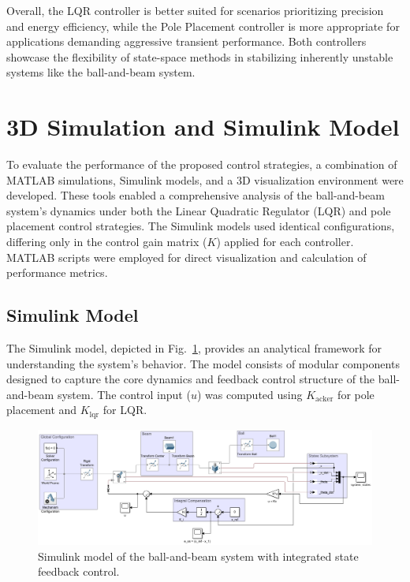 \documentclass[conference]{IEEEtran}
\begin{document}
Overall, the LQR controller is better suited for scenarios prioritizing precision and energy efficiency, while the Pole Placement controller is more appropriate for applications demanding aggressive transient performance. Both controllers showcase the flexibility of state-space methods in stabilizing inherently unstable systems like the ball-and-beam system.

\section{3D Simulation and Simulink Model}
\label{sec:simulation_model}

To evaluate the performance of the proposed control strategies, a combination of MATLAB simulations, Simulink models, and a 3D visualization environment were developed. These tools enabled a comprehensive analysis of the ball-and-beam system's dynamics under both the Linear Quadratic Regulator (LQR) and pole placement control strategies. The Simulink models used identical configurations, differing only in the control gain matrix (\(K\)) applied for each controller. MATLAB scripts were employed for direct visualization and calculation of performance metrics.

\subsection{Simulink Model}
\label{subsec:simulink_model}

The Simulink model, depicted in Fig.~\ref{fig:simulink_model}, provides an analytical framework for understanding the system's behavior. The model consists of modular components designed to capture the core dynamics and feedback control structure of the ball-and-beam system. The control input (\(u\)) was computed using \(K_{\text{acker}}\) for pole placement and \(K_{\text{lqr}}\) for LQR.

\begin{figure}[H]
    \centering
    \includegraphics[width=\linewidth]{figures/simulink_model.png}
    \caption{Simulink model of the ball-and-beam system with integrated state feedback control.}
    \label{fig:simulink_model}
\end{figure}
\end{document}
